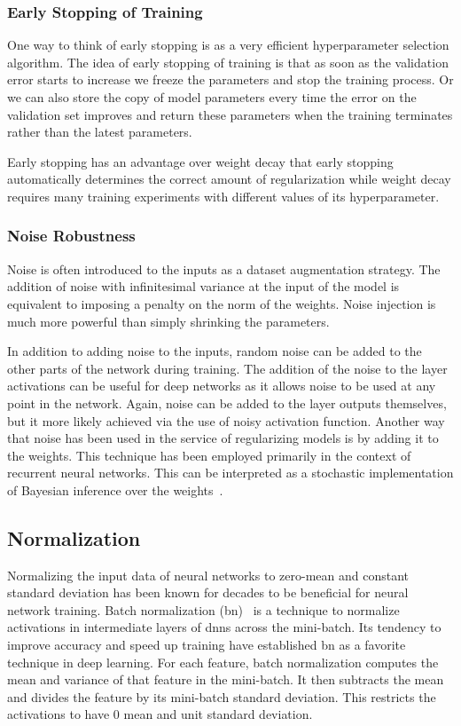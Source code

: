 \subsubsection{Early Stopping of Training}
One way to think of early stopping is as a very efficient hyperparameter selection algorithm. The idea of early stopping of training is that as soon as the validation error starts to increase we freeze the parameters and stop the training process. Or we can also store the copy of model parameters every time the error on the validation set improves and return these parameters when the training terminates rather than the latest parameters.

Early stopping has an advantage over weight decay that early stopping automatically determines the correct amount of regularization while weight decay requires many training experiments with different values of its hyperparameter.


\subsubsection{Noise Robustness}
Noise is often introduced to the inputs as a dataset augmentation strategy. The addition of noise with infinitesimal variance at the input of the model is equivalent to imposing a  penalty on the norm of the weights. Noise injection is much more powerful than simply shrinking the parameters. 

In addition to adding noise to the inputs, random noise can be added to the other parts of the network during training. 
The addition of the noise to the layer activations can be useful for deep networks as it allows noise to be used at any point in the network. Again, noise can be added to the layer outputs themselves, but it more likely achieved via the use of noisy activation function. Another way that noise has been used in the service of regularizing models is by adding it to the weights. This technique has been employed primarily in the context of recurrent neural networks. This can be interpreted as a stochastic implementation of Bayesian inference over the weights~\cite{Goodfellow_16}.



\subsection{Normalization}
Normalizing the input data of neural networks to zero-mean and constant standard deviation has been known for decades to be beneficial for neural network training. Batch normalization (\gls{bn})~\cite{Ioffe_15} is a technique to normalize activations in intermediate layers  of \gls{dnn}s across the mini-batch.   Its tendency to improve accuracy and speed up training have established \gls{bn} as a favorite technique in deep learning. For each feature, batch normalization computes the mean and variance of that feature in the mini-batch. It then subtracts the mean and divides the feature by its mini-batch standard deviation. This restricts the activations to have $0$ mean and unit standard deviation.

